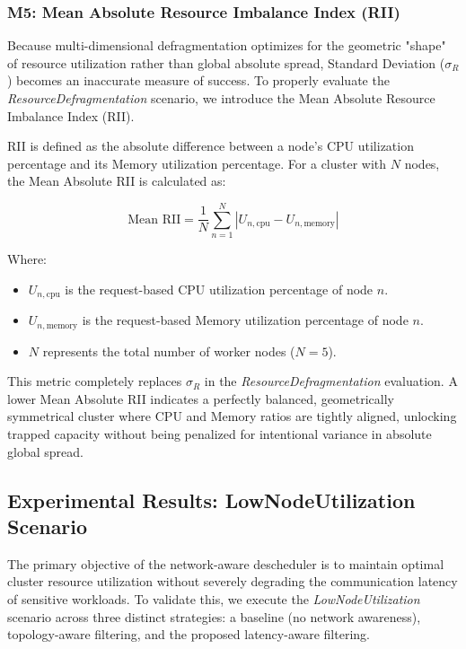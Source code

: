\subsubsection{M5: Mean Absolute Resource Imbalance Index (RII)}
\label{subsubsec:netaware4_evaluationmetrics5}
Because multi-dimensional defragmentation optimizes for the geometric "shape" of resource utilization rather than global absolute spread, Standard Deviation (\(\sigma_R\)) becomes an inaccurate measure of success. To properly evaluate the \textit{ResourceDefragmentation} scenario, we introduce the Mean Absolute Resource Imbalance Index (RII).

RII is defined as the absolute difference between a node's CPU utilization percentage and its Memory utilization percentage. For a cluster with \(N\) nodes, the Mean Absolute RII is calculated as:

\[
\text{Mean RII} = \frac{1}{N} \sum_{n=1}^{N} \left| U_{n,\text{cpu}} - U_{n,\text{memory}} \right|
\]

Where:
\begin{itemize}
    \item \(U_{n,\text{cpu}}\) is the request-based CPU utilization percentage of node \(n\).
    \item \(U_{n,\text{memory}}\) is the request-based Memory utilization percentage of node \(n\).
    \item \(N\) represents the total number of worker nodes (\(N=5\)).
\end{itemize}

This metric completely replaces \(\sigma_R\) in the \textit{ResourceDefragmentation} evaluation. A lower Mean Absolute RII indicates a perfectly balanced, geometrically symmetrical cluster where CPU and Memory ratios are tightly aligned, unlocking trapped capacity without being penalized for intentional variance in absolute global spread.

\subsection{Experimental Results: LowNodeUtilization Scenario}
\label{subsec:netaware4_resultanalysis1}
The primary objective of the network-aware descheduler is to maintain optimal cluster resource utilization without severely degrading the communication latency of sensitive workloads. To validate this, we execute the \textit{LowNodeUtilization} scenario across three distinct strategies: a baseline (no network awareness), topology-aware filtering, and the proposed latency-aware filtering. 

